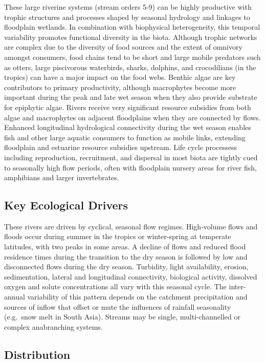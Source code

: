 \documentclass[
  letterpaper,
  DIV=11,
  numbers=noendperiod]{scrartcl}
\begin{document}
These large riverine systems (stream orders 5-9) can be highly
productive with trophic structures and processes shaped by seasonal
hydrology and linkages to floodplain wetlands. In combination with
biophysical heterogeneity, this temporal variability promotes functional
diversity in the biota. Although trophic networks are complex due to the
diversity of food sources and the extent of omnivory amongst consumers,
food chains tend to be short and large mobile predators such as otters,
large piscivorous waterbirds, sharks, dolphins, and crocodilians (in the
tropics) can have a major impact on the food webs. Benthic algae are key
contributors to primary productivity, although macrophytes become more
important during the peak and late wet season when they also provide
substrate for epiphytic algae. Rivers receive very significant resource
subsidies from both algae and macrophytes on adjacent floodplains when
they are connected by flows. Enhanced longitudinal hydrological
connectivity during the wet season enables fish and other large aquatic
consumers to function as mobile links, extending floodplain and
estuarine resource subsidies upstream. Life cycle processess including
reproduction, recruitment, and dispersal in most biota are tightly cued
to seasonally high flow periods, often with floodplain nursery areas for
river fish, amphibians and larger invertebrates.

\subsection{Key Ecological Drivers}\label{key-ecological-drivers-113}

These rivers are driven by cyclical, seasonal flow regimes. High-volume
flows and floods occur during summer in the tropics or winter-spring at
temperate latitudes, with two peaks in some areas. A decline of flows
and reduced flood residence times during the transition to the dry
season is followed by low and disconnected flows during the dry season.
Turbidity, light availability, erosion, sedimentation, lateral and
longitudinal connectivity, biological activity, dissolved oxygen and
solute concentrations all vary with this seasonal cycle. The
inter-annual variability of this pattern depends on the catchment
precipitation and sources of inflow that offset or mute the influences
of rainfall seasonality (e.g.~snow melt in South Asia). Streams may be
single, multi-channelled or complex anabranching systems.

\subsection{Distribution}\label{distribution-113}
\end{document}
